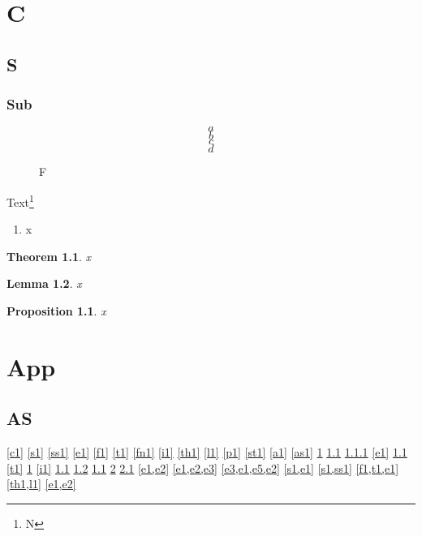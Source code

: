 \documentclass{book}
\newtheorem{theorem}{Theorem}
\newtheorem{lemma}[theorem]{Lemma}
\newtheorem{prop}{Proposition}
\newcounter{step}
\begin{document}
\chapter{C}\label{c1}
\section{S}\label{s1}
\subsection{Sub}\label{ss1}
\begin{equation}a\label{e1}\end{equation}
\begin{equation}b\label{e2}\end{equation}
\begin{equation}c\label{e3}\end{equation}
\begin{equation}d\label{e5}\end{equation}
\begin{figure}\caption{F}\label{f1}\end{figure}
\begin{table}\caption{T}\label{t1}\end{table}
Text\footnote{N\label{fn1}}
\begin{enumerate}\item x\label{i1}\end{enumerate}
\begin{theorem}\label{th1}x\end{theorem}
\begin{lemma}\label{l1}x\end{lemma}
\begin{prop}\label{p1}x\end{prop}
\label{st1}
\appendix
\chapter{App}\label{a1}
\section{AS}\label{as1}
\clearpage
\autoref{c1}
\autoref{s1}
\autoref{ss1}
\autoref{e1}
\autoref{f1}
\autoref{t1}
\autoref{fn1}
\autoref{i1}
\autoref{th1}
\autoref{l1}
\autoref{p1}
\autoref{st1}
\autoref{a1}
\autoref{as1}
\cref{c1}
\cref{s1}
\cref{ss1}
\cref{e1}
\cref{f1}
\cref{t1}
\cref{fn1}
\cref{i1}
\cref{th1}
\cref{l1}
\cref{p1}
\cref{a1}
\cref{as1}
\cref{e1,e2}
\cref{e1,e2,e3}
\cref{e3,e1,e5,e2}
\cref{s1,e1}
\cref{s1,ss1}
\cref{f1,t1,e1}
\cref{th1,l1}
\ref{e1,e2}
\end{document}
